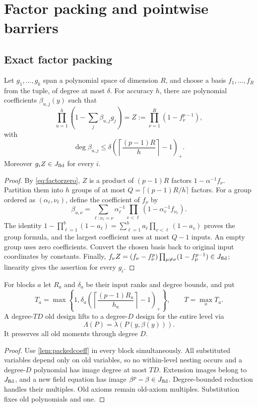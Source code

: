 \chapter{Factor packing and pointwise barriers}\label{ch:packing}

\section{Exact factor packing}
\begin{lemma}\label{lem:packedcoeff}
Let $g_1,\ldots,g_k$ span a polynomial space of dimension $R$, and choose a basis $f_1,\ldots,f_R$ from the tuple, of degree at most $\delta$. For accuracy $h$, there are polynomial coefficients $\beta_{u,j}(y)$ such that
\[
 \prod_{u=1}^h\left(1-\sum_j\beta_{u,j}g_j\right)
 =Z:=\prod_{\nu=1}^R(1-f_\nu^{p-1}),
\]
with
\[
 \boxed{\deg\beta_{u,j}\le
 \delta\left(\left\lceil\frac{(p-1)R}{h}\right\rceil-1\right)_+.}
\]
Moreover $g_iZ\in J_{\mathrm{fld}}$ for every $i$.
\end{lemma}
\begin{proof}
By \eqref{eq:factorzero}, $Z$ is a product of $(p-1)R$ factors $1-\alpha^{-1}f_\nu$. Partition them into $h$ groups of at most $Q=\lceil(p-1)R/h\rceil$ factors. For a group ordered as $(\alpha_\ell,\nu_\ell)$, define the coefficient of $f_\nu$ by
\[
 \beta_{u,\nu}=
 \sum_{\ell:\nu_\ell=\nu}\alpha_\ell^{-1}
 \prod_{v<\ell}(1-\alpha_v^{-1}f_{\nu_v}).
\]
The identity
$1-\prod_{\ell=1}^b(1-a_\ell)=\sum_{\ell=1}^b a_\ell\prod_{v<\ell}(1-a_v)$
proves the group formula, and the largest coefficient uses at most $Q-1$ inputs. An empty group uses zero coefficients. Convert the chosen basis back to original input coordinates by constants. Finally,
$f_\nu Z=(f_\nu-f_\nu^p)\prod_{\mu\ne\nu}(1-f_\mu^{p-1})\in J_{\mathrm{fld}}$;
linearity gives the assertion for every $g_i$.
\end{proof}

\begin{lemma}\label{lem:packedlift}
For blocks $a$ let $R_a$ and $\delta_a$ be their input ranks and degree bounds, and put
\[
 T_a=\max\left\{1,\delta_a
 \left(\left\lceil\frac{(p-1)R_a}{h_a}\right\rceil-1\right)_+\right\},
 \qquad T=\max_aT_a.
\]
A degree-$TD$ old design lifts to a degree-$D$ design for the entire level via
\[
 \Lambda(P)=\lambda(P(y,\beta(y))).
\]
It preserves all old moments through degree $D$.
\end{lemma}
\begin{proof}
Use \cref{lem:packedcoeff} in every block simultaneously. All substituted variables depend only on old variables, so no within-level nesting occurs and a degree-$D$ polynomial has image degree at most $TD$. Extension images belong to $J_{\mathrm{fld}}$, and a new field equation has image $\beta^p-\beta\in J_{\mathrm{fld}}$. Degree-bounded reduction handles their multiples. Old axioms remain old-axiom multiples. Substitution fixes old polynomials and one.
\end{proof}

